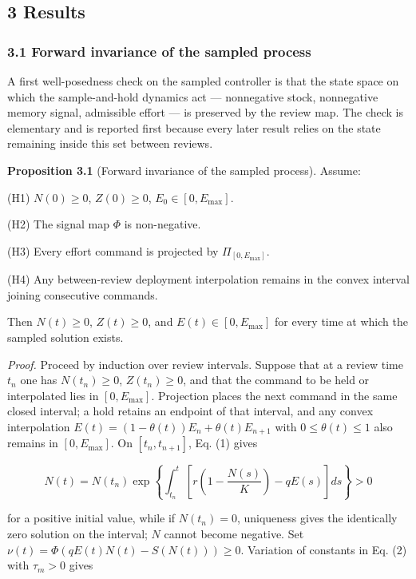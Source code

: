 \documentclass[11pt]{article}
\begin{document}
\subsection{3 Results}\label{results}

\subsubsection{3.1 Forward invariance of the sampled
process}\label{forward-invariance-of-the-sampled-process}

A first well-posedness check on the sampled controller is that the state
space on which the sample-and-hold dynamics act --- nonnegative stock,
nonnegative memory signal, admissible effort --- is preserved by the
review map. The check is elementary and is reported first because every
later result relies on the state remaining inside this set between
reviews.

\textbf{Proposition 3.1} (Forward invariance of the sampled process).
Assume:

(H1) \(N(0)\ge 0\), \(Z(0)\ge 0\), \(E_0\in[0,E_{\max}]\).

(H2) The signal map \(\Phi\) is non-negative.

(H3) Every effort command is projected by \(\Pi_{[0,E_{\max}]}\).

(H4) Any between-review deployment interpolation remains in the convex
interval joining consecutive commands.

Then \(N(t)\ge 0\), \(Z(t)\ge 0\), and \(E(t)\in[0,E_{\max}]\) for every
time at which the sampled solution exists.

\emph{Proof.} Proceed by induction over review intervals. Suppose that
at a review time \(t_n\) one has \(N(t_n)\ge 0\), \(Z(t_n)\ge 0\), and
that the command to be held or interpolated lies in \([0,E_{\max}]\).
Projection places the next command in the same closed interval; a hold
retains an endpoint of that interval, and any convex interpolation
\(E(t)=(1-\theta(t))E_n+\theta(t)E_{n+1}\) with \(0\le\theta(t)\le 1\)
also remains in \([0,E_{\max}]\). On \([t_n,t_{n+1}]\), Eq. (1) gives

\[
N(t)=N(t_n)\exp\left\{\int_{t_n}^{t}\left[r\left(1-\frac{N(s)}{K}\right)-qE(s)\right]ds\right\}>0
\]

for a positive initial value, while if \(N(t_n)=0\), uniqueness gives
the identically zero solution on the interval; \(N\) cannot become
negative. Set \(\nu(t)=\Phi(qE(t)N(t)-S(N(t)))\ge 0\). Variation of
constants in Eq. (2) with \(\tau_m>0\) gives
\end{document}
